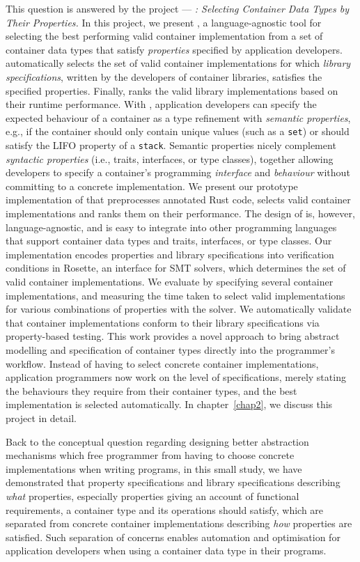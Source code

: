 This question is answered by the project --- \emph{\Primrose{}: Selecting Container Data Types by Their Properties.}
In this project, we present \Primrose{}, a language-agnostic tool for selecting the best performing valid container implementation from a set of container data types that satisfy \emph{properties} specified by application developers.
\Primrose{} automatically selects the set of valid container implementations for which \emph{library specifications}, written by the developers of container libraries, satisfies the specified properties.
Finally, \Primrose{} ranks the valid library implementations based on their runtime performance.
With \Primrose{}, application developers can specify the expected behaviour of a container as a type refinement with \emph{semantic properties}, e.g., if the container should only contain unique values (such as a \lstinline{set}) or should satisfy the LIFO property of a \lstinline{stack}.
Semantic properties nicely complement \emph{syntactic properties} (i.e., traits, interfaces, or type classes), together allowing developers to specify a container's programming \emph{interface} and \emph{behaviour} without committing to a concrete implementation.
We present our prototype implementation of \Primrose{} that preprocesses annotated Rust code, selects valid container implementations and ranks them on their performance. The design of \Primrose{} is, however, language-agnostic, and is easy to integrate into other programming languages that support container data types and traits, interfaces, or type classes. Our implementation encodes properties and library specifications into verification conditions in Rosette, an interface for SMT solvers, which determines the set of valid container implementations. We evaluate \Primrose{} by specifying several container implementations, and measuring the time taken to select valid implementations for various combinations of properties with the solver. We automatically validate that container implementations conform to their library specifications via property-based testing.
This work provides a novel approach to bring abstract modelling and specification of container types directly into the programmer's workflow.
Instead of having to select concrete container implementations, application programmers now work on the level of specifications, merely stating the behaviours they require from their container types, and the best implementation is selected automatically. In chapter~\ref{chap2}, we discuss this project in detail.

Back to the conceptual question regarding designing better abstraction mechanisms which free programmer from having to choose concrete implementations when writing programs, in this small study, we have demonstrated that property specifications and library specifications describing \emph{what} properties, especially properties giving an account of functional requirements, a container type and its operations should satisfy, which are separated from concrete container implementations describing \emph{how} properties are satisfied. Such separation of concerns enables automation and optimisation for application developers when using a container data type in their programs.

